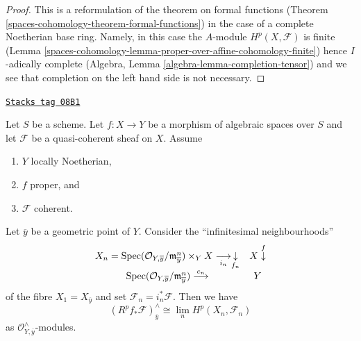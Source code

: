 \begin{proof}
This is a reformulation of the theorem on formal functions
(Theorem \ref{spaces-cohomology-theorem-formal-functions}) in the
case of a complete Noetherian base ring. Namely, in this case the
$A$-module $H^p(X, \mathcal{F})$ is finite
(Lemma \ref{spaces-cohomology-lemma-proper-over-affine-cohomology-finite}) hence
$I$-adically complete (Algebra, Lemma \ref{algebra-lemma-completion-tensor})
and we see that completion on the left hand side is not necessary.
\end{proof}

\begin{lemma}
\label{spaces-cohomology-lemma-formal-functions-stalk}
\href{https://stacks.math.columbia.edu/tag/08B1}{\texttt{Stacks tag 08B1}}

Let $S$ be a scheme. Let $f : X \to Y$ be a morphism of algebraic spaces
over $S$ and let $\mathcal{F}$ be a quasi-coherent sheaf on $X$. Assume
\begin{enumerate}
\item $Y$ locally Noetherian,
\item $f$ proper, and
\item $\mathcal{F}$ coherent.
\end{enumerate}
Let $\overline{y}$ be a geometric point of $Y$.
Consider the ``infinitesimal neighbourhoods''
$$
\begin{array}{cc}X_n =
\operatorname{Spec}(\mathcal{O}_{Y, \overline{y}}/\mathfrak m_{\overline{y}}^n) \times_Y X
\underset{i_n}{\longrightarrow}\underset{f_n}{\downarrow} & X \overset{f}{\downarrow} \\ \operatorname{Spec}(\mathcal{O}_{Y, \overline{y}}/\mathfrak m_{\overline{y}}^n)
\overset{c_n}{\longrightarrow} & Y\end{array}
$$
of the fibre $X_1 = X_{\overline{y}}$ and set
$\mathcal{F}_n = i_n^*\mathcal{F}$. Then we have
$$
\left(R^pf_*\mathcal{F}\right)_{\overline{y}}^\wedge
\cong
\lim_n H^p(X_n, \mathcal{F}_n)
$$
as $\mathcal{O}_{Y, \overline{y}}^\wedge$-modules.
\end{lemma}

